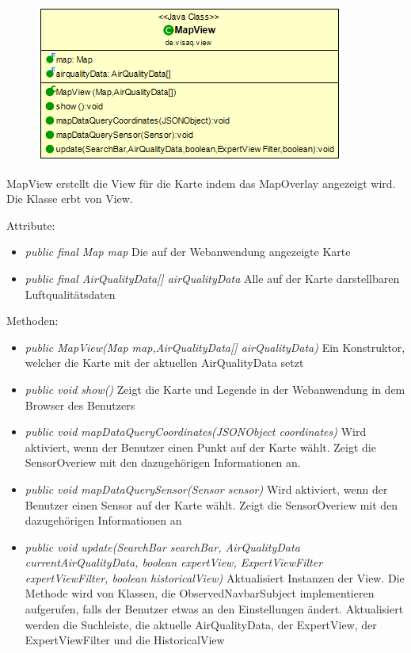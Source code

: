 \begin{minipage}{0.4\textwidth}
    \begin{figure}[H]
        \includegraphics[scale = 0.5]{media/frontend/view/de.view/MapView_Class.png}
    \end{figure}
\end{minipage} \hfill
\begin{minipage}{0.5\textwidth}
    MapView erstellt die View für die Karte indem das MapOverlay angezeigt wird. Die Klasse erbt von View.
\end{minipage}

Attribute:
\begin{itemize}
    \item \emph{public final Map map} Die auf der Webanwendung angezeigte Karte
    \item \emph{public final AirQualityData[] airQualityData} Alle auf der Karte darstellbaren Luftqualitätsdaten
\end{itemize}
Methoden:
\begin{itemize}
    \item \emph{public MapView(Map map,AirQualityData[] airQualityData)} Ein Konstruktor, welcher die Karte mit der aktuellen AirQualityData setzt
    \item \emph{public void show()} Zeigt die Karte und Legende in der Webanwendung in dem Browser des Benutzers
    \item \emph{public void mapDataQueryCoordinates(JSONObject coordinates)} Wird aktiviert, wenn der Benutzer einen Punkt auf der Karte wählt. Zeigt die SensorOveriew mit den dazugehörigen Informationen an.
    \item \emph{public void mapDataQuerySensor(Sensor sensor)} Wird aktiviert, wenn der Benutzer einen Sensor auf der Karte wählt. Zeigt die SensorOveriew mit den dazugehörigen Informationen an
    \item \emph{public void update(SearchBar searchBar, AirQualityData currentAirQualityData,
              boolean expertView, ExpertViewFilter expertViewFilter, boolean historicalView)} Aktualisiert Instanzen der View. Die Methode wird von Klassen, die ObservedNavbarSubject implementieren aufgerufen, falls der Benutzer etwas an den Einstellungen ändert. Aktualisiert werden die Suchleiste, die aktuelle AirQualityData, der ExpertView, der ExpertViewFilter und die HistoricalView
\end{itemize}

